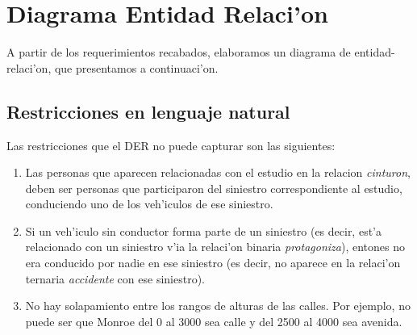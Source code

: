 \section{Diagrama Entidad Relaci'on}

A partir de los requerimientos recabados, elaboramos un diagrama de entidad-relaci'on, que presentamos a continuaci'on.



\subsection{Restricciones en lenguaje natural}

Las restricciones que el DER no puede capturar son las siguientes:

\begin{enumerate}
\item Las personas que aparecen relacionadas con el estudio en la relacion \textit{cinturon}, deben ser personas que participaron del siniestro correspondiente al estudio, conduciendo uno de los veh'iculos de ese siniestro.

\item Si un veh'iculo sin conductor forma parte de un siniestro (es decir, est'a relacionado con un siniestro v'ia la relaci'on binaria \textit{protagoniza}), entones no era conducido por nadie en ese siniestro (es decir, no aparece en la relaci'on ternaria \textit{accidente} con ese siniestro).

\item No hay solapamiento entre los rangos de alturas de las calles. Por ejemplo, no puede ser que Monroe del 0 al 3000 sea calle y del 2500 al 4000 sea avenida.

\end{enumerate}
